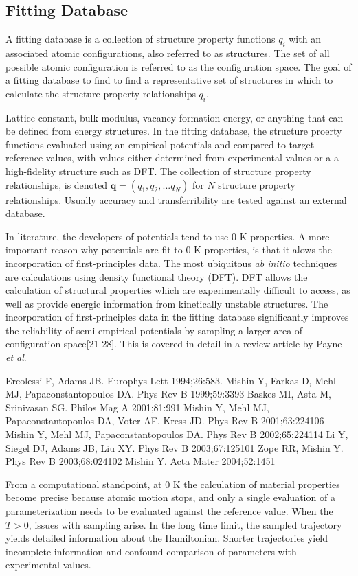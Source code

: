 \subsection{Fitting Database}
A fitting database is a collection of structure property functions $q_i$ with an associated atomic configurations, also referred to as structures.
The set of all possible atomic configuration is referred to as the configuration space.
The goal of a fitting database to find to find a representative set of structures in which to calculate the structure property relationships $q_i$.

Lattice constant, bulk modulus, vacancy formation energy, or anything that can be defined from energy structures.  In the fitting database, the structure proerty functions evaluated using an empirical potentials and compared to target reference values, with values either determined from experimental values or a a high-fidelity structure such as DFT.  The collection of structure property relationships, is denoted $\bm{q}=(q_1,q_2,...q_N)$ for $N$ structure property relationships.  Usually accuracy and transferribility are tested against an external database.

In literature, the developers of potentials tend to use $0$ K properties.  A more important reason why potentials are fit to $0$ K properties, is that it alows the incorporation of first-principles data.
The most ubiquitous \emph{ab initio} techniques are calculations using density functional theory (DFT).
DFT allows the calculation of structural properties which are experimentally difficult to access, as well as provide energic information from kinetically unstable structures.
The incorporation of first-principles data in the fitting database significantly improves the reliability of semi-empirical potentials by sampling a larger area of configuration space[21-28].
This is covered in detail in a review article by Payne \emph{et al}\cite{payne1996_dft_database}.


Ercolessi F, Adams JB. Europhys Lett 1994;26:583.
Mishin Y, Farkas D, Mehl MJ, Papaconstantopoulos DA. Phys Rev B 1999;59:3393
Baskes MI, Asta M, Srinivasan SG. Philos Mag A 2001;81:991
Mishin Y, Mehl MJ, Papaconstantopoulos DA, Voter AF, Kress JD. Phys Rev B 2001;63:224106
Mishin Y, Mehl MJ, Papaconstantopoulos DA. Phys Rev B 2002;65:224114
Li Y, Siegel DJ, Adams JB, Liu XY. Phys Rev B 2003;67:125101
Zope RR, Mishin Y. Phys Rev B 2003;68:024102
Mishin Y. Acta Mater 2004;52:1451

From a computational standpoint, at $0$ K the calculation of material properties become precise because atomic motion stops, and only a single evaluation of a parameterization needs to be evaluated against the reference value.  When the $T>0$, issues with sampling arise.  In the long time limit, the sampled trajectory yields detailed information about the Hamiltonian.  Shorter trajectories yield incomplete information and confound comparison of parameters with experimental values.

